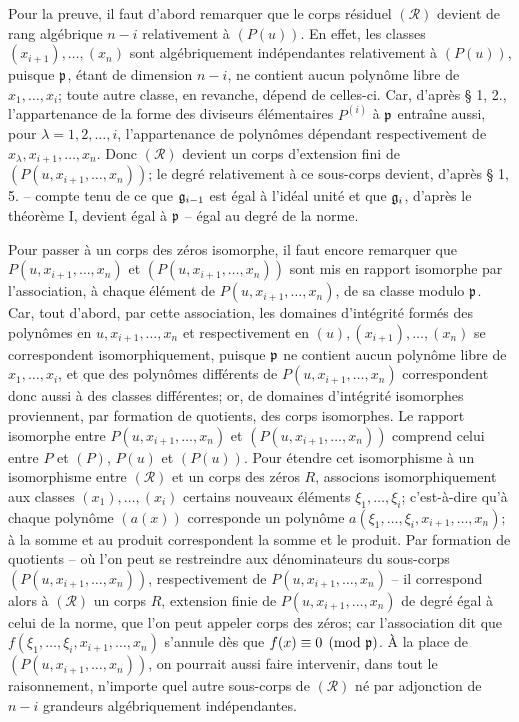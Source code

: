 Pour la preuve, il faut d'abord remarquer que le corps résiduel $(\mathcal R)$ devient de rang algébrique $n-i$ relativement à $(P(u))$. En effet, les classes $(x_{i+1}),\ldots,(x_n)$ sont algébriquement indépendantes relativement à $(P(u))$, puisque $\mathfrak p$, étant de dimension $n-i$, ne contient aucun polynôme libre de $x_1,\ldots,x_i$; toute autre classe, en revanche, dépend de celles-ci. Car, d'après \S{} 1, 2., l'appartenance de la forme des diviseurs élémentaires $P^{(i)}$ à $\mathfrak p$ entraîne aussi, pour $\lambda=1,2,\ldots,i$, l'appartenance de polynômes dépendant respectivement de $x_\lambda,x_{i+1},\ldots,x_n$. Donc $(\mathcal R)$ devient un corps d'extension fini de $(P(u,x_{i+1},\ldots,x_n))$; le degré relativement à ce sous-corps devient, d'après \S{} 1, 5. -- compte tenu de ce que $\mathfrak g_{i-1}$ est égal à l'idéal unité et que $\mathfrak g_i$, d'après le théorème I, devient égal à $\mathfrak p$ -- égal au degré de la norme.

Pour passer à un corps des zéros isomorphe, il faut encore remarquer que $P(u,x_{i+1},\ldots,x_n)$ et $(P(u,x_{i+1},\ldots,x_n))$ sont mis en rapport isomorphe par l'association, à chaque élément de $P(u,x_{i+1},\ldots,x_n)$, de sa classe modulo $\mathfrak p$. Car, tout d'abord, par cette association, les domaines d'intégrité formés des polynômes en $u,x_{i+1},\ldots,x_n$ et respectivement en $(u),(x_{i+1}),\ldots,(x_n)$ se correspondent isomorphiquement, puisque $\mathfrak p$ ne contient aucun polynôme libre de $x_1,\ldots,x_i$, et que des polynômes différents de $P(u,x_{i+1},\ldots,x_n)$ correspondent donc aussi à des classes différentes; or, de domaines d'intégrité isomorphes proviennent, par formation de quotients, des corps isomorphes. Le rapport isomorphe entre $P(u,x_{i+1},\ldots,x_n)$ et $(P(u,x_{i+1},\ldots,x_n))$ comprend celui entre $P$ et $(P)$, $P(u)$ et $(P(u))$. Pour étendre cet isomorphisme à un isomorphisme entre $(\mathcal R)$ et un corps des zéros $R$, associons isomorphiquement aux classes $(x_1),\ldots,(x_i)$ certains nouveaux éléments $\xi_1,\ldots,\xi_i$; c'est-à-dire qu'à chaque polynôme $(a(x))$ corresponde un polynôme $a(\xi_1,\ldots,\xi_i,x_{i+1},\ldots,x_n)$; à la somme et au produit correspondent la somme et le produit. Par formation de quotients -- où l'on peut se restreindre aux dénominateurs du sous-corps $(P(u,x_{i+1},\ldots,x_n))$, respectivement de $P(u,x_{i+1},\ldots,x_n)$ -- il correspond alors à $(\mathcal R)$ un corps $R$, extension finie de $P(u,x_{i+1},\ldots,x_n)$ de degré égal à celui de la norme, que l'on peut appeler corps des zéros; car l'association dit que $f(\xi_1,\ldots,\xi_i,x_{i+1},\ldots,x_n)$ s'annule dès que $f(x)\equiv0\pmod{\mathfrak p}$. À la place de $(P(u,x_{i+1},\ldots,x_n))$, on pourrait aussi faire intervenir, dans tout le raisonnement, n'importe quel autre sous-corps de $(\mathcal R)$ né par adjonction de $n-i$ grandeurs algébriquement indépendantes.

